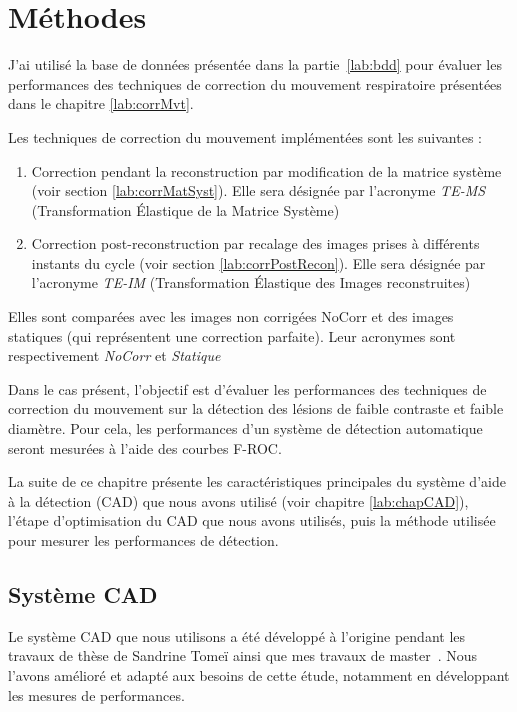 \chapter{Méthodes}

J'ai utilisé la base de données présentée dans la partie~\ref{lab:bdd} pour évaluer les performances des techniques de correction du mouvement respiratoire présentées dans le chapitre \ref{lab:corrMvt}. 

Les techniques de correction du mouvement implémentées sont les suivantes :

\begin{enumerate}
 \item Correction pendant la reconstruction par modification de la matrice système (voir section \ref{lab:corrMatSyst}). Elle sera désignée par l'acronyme \emph{TE-MS} (Transformation \'Elastique de la Matrice Système)
 \item Correction post-reconstruction par recalage des images prises à différents instants du cycle (voir section \ref{lab:corrPostRecon}). Elle sera désignée par l'acronyme \emph{TE-IM} (Transformation \'Elastique des Images reconstruites) 
\end{enumerate}

Elles sont comparées avec les images non corrigées NoCorr et des images statiques (qui représentent une correction parfaite). Leur acronymes sont respectivement \emph{NoCorr} et \emph{Statique}

Dans le cas présent, l'objectif est d'évaluer les performances des techniques de correction du mouvement sur la détection des lésions de faible contraste et faible diamètre. Pour cela, les performances d'un système de détection automatique seront mesurées à l'aide des courbes F-ROC.

La suite de ce chapitre présente les caractéristiques principales du système d'aide à la détection (CAD) que nous avons utilisé (voir chapitre \ref{lab:chapCAD}), l'étape d'optimisation du CAD que nous avons utilisés, puis la méthode utilisée pour mesurer les performances de détection.

\section{Système CAD} %

Le système CAD que nous utilisons a été développé à l'origine pendant les travaux de thèse de Sandrine Tomeï ainsi que mes travaux de master~\cite{tomei2008automatic,lartizien2010impact}. Nous l'avons amélioré et adapté aux besoins de cette étude, notamment en développant les mesures de performances.


